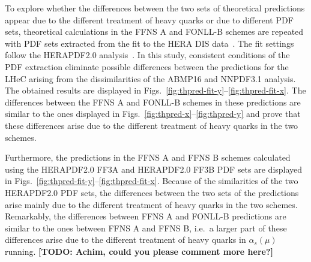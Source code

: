 \documentclass[pdftex,twocolumn,epjc3]{svjour3}          %
\newcommand{\abmp} {ABMP16\xspace}
\newcommand{\nnpdf} {NNPDF3.1\xspace}
\newcommand{\fonll} {{FONLL-B}\xspace}
\newcommand{\ffns} {{FFNS A}\xspace}
\newcommand{\ffnsb} {{FFNS B}\xspace}
\newcommand{\ffthreea} {{HERAPDF2.0 FF3A}\xspace}
\newcommand{\ffthreeb} {{HERAPDF2.0 FF3B}\xspace}
\begin{document}
To explore whether the differences between the two sets of theoretical predictions appear due to the different treatment of heavy quarks or due to different PDF sets, theoretical calculations in the \ffns and \fonll schemes are repeated with PDF sets extracted from the fit to the HERA DIS data~\cite{Abramowicz:2015mha}. The fit settings follow the HERAPDF2.0 analysis~\cite{Abramowicz:2015mha}. 
In this study, consistent conditions of the PDF extraction eliminate possible differences between the predictions for the LHeC arising from the dissimilarities of the \abmp and \nnpdf analysis. The obtained results are displayed in Figs.~\ref{fig:thpred-fit-y}--\ref{fig:thpred-fit-x}. The differences between the \ffns and \fonll schemes in these predictions are similar to the ones displayed in Figs.~\ref{fig:thpred-x}--\ref{fig:thpred-y} and prove that these differences arise due to the different treatment of heavy quarks in the two schemes.

Furthermore, the predictions in the \ffns and \ffnsb schemes calculated using the \ffthreea and \ffthreeb PDF sets are displayed in Figs.~\ref{fig:thpred-fit-y}--\ref{fig:thpred-fit-x}. Because of the similarities of the two HERAPDF2.0 PDF sets, the differences between the two sets of the predictions arise mainly due to the different treatment of heavy quarks in the two schemes. Remarkably, the differences between \ffns and \fonll predictions are similar to the ones between \ffns and \ffnsb, i.e.\ a larger part of these differences arise due to the different treatment of heavy quarks in $\alpha_s(\mu)$ running.
{\bf [TODO: Achim, could you please comment more here?]}
\end{document}
